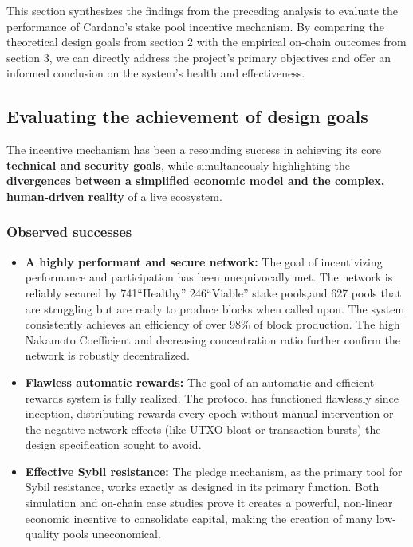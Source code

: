 \documentclass[11pt, letterpaper]{article}
\begin{document}
\label{sec:synthesis}

This section synthesizes the findings from the preceding analysis to evaluate the
performance of Cardano's stake pool incentive mechanism. By comparing the theoretical
design goals from section 2 with the empirical on-chain outcomes from section 3, we
can directly address the project's primary objectives and offer an informed conclusion
on the system's health and effectiveness.

\subsection{Evaluating the achievement of design goals}
\label{sec:evaluating-goals}

The incentive mechanism has been a resounding success in achieving its core
\textbf{technical and security goals}, while simultaneously highlighting the
\textbf{divergences between a simplified economic model and the complex, human-driven reality}
of a live ecosystem.

\subsubsection{Observed successes}

\begin{itemize}
	\item \textbf{A highly performant and secure network:} The goal of incentivizing performance
	      and participation has been unequivocally met. The network is reliably secured by 741``Healthy''
	      246``Viable'' stake pools,and 627 pools that are struggling but are ready to produce blocks when called upon.
	      The system consistently achieves an efficiency of over 98\% of block production. The high Nakamoto Coefficient and decreasing concentration ratio further confirm the network is robustly decentralized.
	\item \textbf{Flawless automatic rewards:} The goal of an automatic and efficient rewards system is fully
	      realized. The protocol has functioned flawlessly since inception, distributing rewards every epoch
	      without manual intervention or the negative network effects (like UTXO bloat or transaction bursts) the
	      design specification sought to avoid.
	\item \textbf{Effective Sybil resistance:} The pledge mechanism, as the primary tool for Sybil resistance,
	      works exactly as designed in its primary function. Both simulation and on-chain case studies prove
	      it creates a powerful, non-linear economic incentive to consolidate capital, making the creation
	      of many low-quality pools uneconomical.
\end{itemize}
\end{document}
